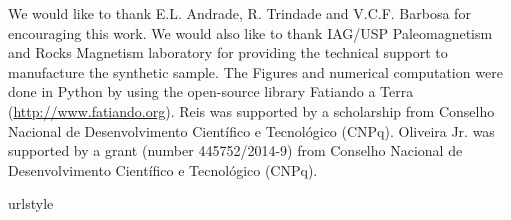 \documentclass[draft,gc]{agutex}
\begin{document}
\begin{article}
\begin{acknowledgments}
We would like to thank E.L. Andrade, R. Trindade and V.C.F. Barbosa
for encouraging this work. We would also like to thank
IAG/USP Paleomagnetism and Rocks Magnetism laboratory for providing the
technical support to manufacture the synthetic sample.
The Figures and numerical computation were done in Python
by using the open-source library Fatiando a Terra 
(\url{http://www.fatiando.org}).
Reis was supported by a scholarship from Conselho Nacional 
de Desenvolvimento Cient\'{i}fico e Tecnol\'{o}gico (CNPq). 
Oliveira Jr. was supported by a grant (number 445752/2014-9)
from Conselho Nacional 
de Desenvolvimento Cient\'{i}fico e Tecnol\'{o}gico (CNPq).
\end{acknowledgments}

%
%
%
%
%
%

%
%
%
%
%
%
%
%
%
%
%
\begin{thebibliography}{56}
\providecommand{\natexlab}[1]{#1}
\expandafter\ifx\csname urlstyle\endcsname\relax
  \providecommand{\doi}[1]{doi:\discretionary{}{}{}#1}\else
  \providecommand{\doi}{doi:\discretionary{}{}{}\begingroup
  \urlstyle{rm}\Url}\fi


\end{thebibliography}
\end{article}
\end{document}

